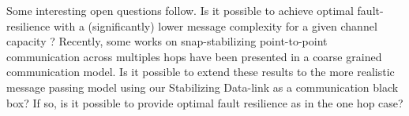 \documentclass[11pt]{article}
\begin{document}
Some interesting open questions follow. Is it possible to achieve optimal fault-resilience with a (significantly) lower message complexity for a given channel capacity ? Recently, some works on snap-stabilizing point-to-point communication \cite{CDV09ca,CDV09cb,CDLPV10c} across multiples hops have been presented in a coarse grained communication model. Is it possible to extend these results to the more realistic message passing model using our Stabilizing Data-link as a communication black box? If so, is it possible to provide optimal fault resilience as in the one hop case?



\end{document}
